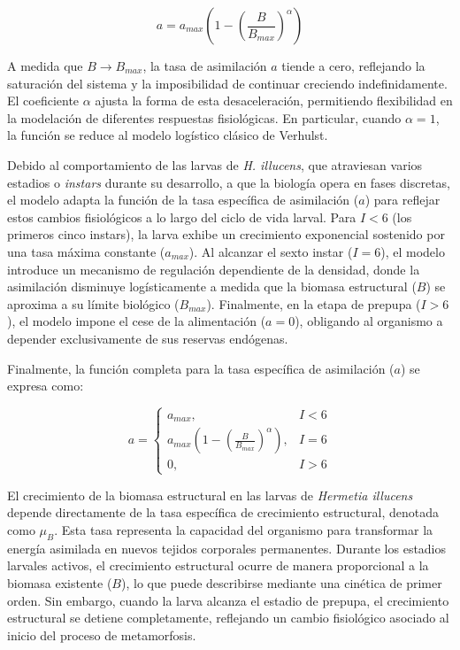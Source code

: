 \begin{equation}
a = a_{max} \left( 1 - \left( \frac{B}{B_{max}} \right)^\alpha \right)
\end{equation}

A medida que $B\rightarrow B_{max}$, la tasa de asimilación $a$ tiende a cero, reflejando la saturación del sistema y la imposibilidad de continuar creciendo indefinidamente. El coeficiente $\alpha$ ajusta la forma de esta desaceleración, permitiendo flexibilidad en la modelación de diferentes respuestas fisiológicas. En particular, cuando $\alpha=1$, la función se reduce al modelo logístico clásico de Verhulst.

Debido al comportamiento de las larvas de \textit{H. illucens}, que atraviesan varios estadios o \textit{instars} durante su desarrollo, a que la biología opera en fases discretas, el modelo adapta la función de la tasa específica de asimilación ($a$) para reflejar estos cambios fisiológicos a lo largo del ciclo de vida larval. Para $I < 6$ (los primeros cinco instars), la larva exhibe un crecimiento exponencial sostenido por una tasa máxima constante ($a_{max}$). Al alcanzar el sexto instar ($I = 6$), el modelo introduce un mecanismo de regulación dependiente de la densidad, donde la asimilación disminuye logísticamente a medida que la biomasa estructural ($B$) se aproxima a su límite biológico ($B_{max}$). Finalmente, en la etapa de prepupa ($I > 6$), el modelo impone el cese de la alimentación ($a=0$), obligando al organismo a depender exclusivamente de sus reservas endógenas.


Finalmente, la función completa para la tasa específica de asimilación ($a$) se expresa como:

\begin{equation}
a = \begin{cases} 
a_{max}, & I < 6 \\
a_{max} \left( 1 - \left( \frac{B}{B_{max}} \right)^\alpha \right), & I = 6 \\
0, & I > 6 
\end{cases}
\end{equation}

El crecimiento de la biomasa estructural en las larvas de \textit{Hermetia illucens} depende 
directamente de la tasa específica de crecimiento estructural, denotada como $\mu_B$. 
Esta tasa representa la capacidad del organismo para transformar la energía asimilada en 
nuevos tejidos corporales permanentes. Durante los estadios larvales activos, el crecimiento 
estructural ocurre de manera proporcional a la biomasa existente ($B$), lo que puede describirse 
mediante una cinética de primer orden. Sin embargo, cuando la larva alcanza el estadio de prepupa, 
el crecimiento estructural se detiene completamente, reflejando un cambio fisiológico asociado 
al inicio del proceso de metamorfosis.

